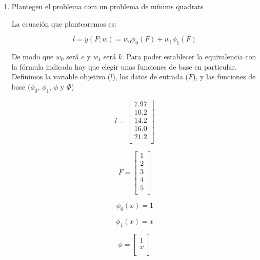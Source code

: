 \documentclass[a4paper]{article}
\begin{document}
\begin{enumerate}
  \item Plantegeu el problema com un problema de mínims quadrats

  {\bfseries

  La ecuación que plantearemos es:

  \begin{equation*}
    l = y(F; w) = w_0\phi_0(F) + w_1\phi_1(F)
  \end{equation*}

  De modo que $w_0$ será $e$ y $w_1$ será $k$. Para poder establecer la equivalencia con la fórmula indicada hay que elegir unas funciones de base en particular.
  Definimos la variable objetivo ($l$), los datos de entrada ($F$), y las funciones de base ($\phi_0$, $\phi_1$, $\phi$ y $\Phi$)
  \begin{multicols}{3}

    \begin{equation*}
      l =
      \begin{bmatrix}
    7.97 \\
    10.2 \\
    14.2 \\
    16.0 \\
    21.2 \\
      \end{bmatrix}
    \end{equation*}


    \begin{equation*}
      F =
      \begin{bmatrix}
        1 \\
        2 \\
        3 \\
        4 \\
        5 \\
      \end{bmatrix}
    \end{equation*}

    \begin{equation*}
      \phi_0(x) = 1
    \end{equation*}

    \begin{equation*}
      \phi_1(x) = x
    \end{equation*}

    \begin{equation*}
      \phi =
      \begin{bmatrix}
        1 \\
        x \\
      \end{bmatrix}
    \end{equation*}


\end{multicols}}
\end{enumerate}
\end{document}
